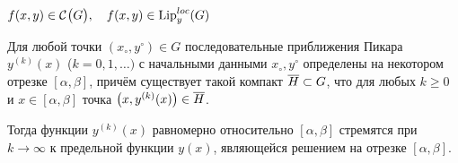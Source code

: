 \begin{theorem}[Пикара]
    $ f(x, y) \in \mathcal{C}^{} \big( {G} \big) , \quad f(x, y) \in \operatorname{Lip}_y^{loc}(G) $

    Для любой точки $ (x_\circ, y^\circ) \in G $ последовательные приближения Пикара $ y^{(k)}(x) $ ($ k = 0, 1, \dots) $ с начальными данными $ x_\circ, y^\circ $ определены на некотором отрезке $ [\alpha, \beta] $, причём существует такой компакт $ \overline H \subset G $, что для любых $ k \ge 0 $ и $ x \in [\alpha, \beta] $ точка $ \big( x, y^{(k)}(x) \big) \in \overline H $.

    Тогда функции $ y^{(k)}(x) $ равномерно относительно $ [\alpha, \beta] $ стремятся при $ k \to \infty $ к предельной функции $ y(x) $, являющейся решением  на отрезке $ [\alpha, \beta] $.
\end{theorem}

